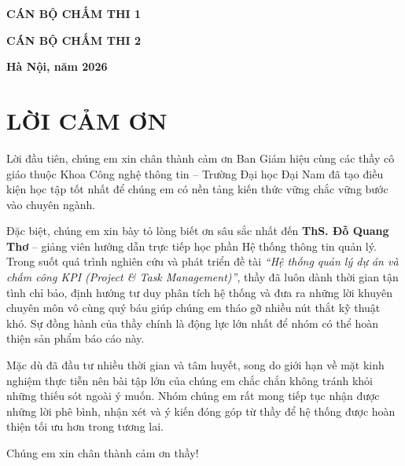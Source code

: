 \documentclass[a4paper,13.5pt]{extreport}
\begin{document}
\begin{titlepage}
\vspace{1.2cm}
\begin{center}
\begin{minipage}{0.45\textwidth}
\centering
\textbf{CÁN BỘ CHẤM THI 1}
\end{minipage}%
\begin{minipage}{0.45\textwidth}
\centering
\textbf{CÁN BỘ CHẤM THI 2}
\end{minipage}
\end{center}

\vfill
\begin{center}
    \textbf{Hà Nội, năm 2026}
\end{center}
\end{titlepage}

\chapter*{LỜI CẢM ƠN}

\vspace{0.5cm} 

Lời đầu tiên, chúng em xin chân thành cảm ơn Ban Giám hiệu cùng các thầy cô giáo thuộc Khoa Công nghệ thông tin – Trường Đại học Đại Nam đã tạo điều kiện học tập tốt nhất để chúng em có nền tảng kiến thức vững chắc vững bước vào chuyên ngành.

Đặc biệt, chúng em xin bày tỏ lòng biết ơn sâu sắc nhất đến \textbf{ThS. Đỗ Quang Thơ} – giảng viên hướng dẫn trực tiếp học phần Hệ thống thông tin quản lý. Trong suốt quá trình nghiên cứu và phát triển đề tài \textit{“Hệ thống quản lý dự án và chấm công KPI (Project \& Task Management)”}, thầy đã luôn dành thời gian tận tình chỉ bảo, định hướng tư duy phân tích hệ thống và đưa ra những lời khuyên chuyên môn vô cùng quý báu giúp chúng em tháo gỡ nhiều nút thắt kỹ thuật khó. Sự đồng hành của thầy chính là động lực lớn nhất để nhóm có thể hoàn thiện sản phẩm báo cáo này.

Mặc dù đã đầu tư nhiều thời gian và tâm huyết, song do giới hạn về mặt kinh nghiệm thực tiễn nên bài tập lớn của chúng em chắc chắn không tránh khỏi những thiếu sót ngoài ý muốn. Nhóm chúng em rất mong tiếp tục nhận được những lời phê bình, nhận xét và ý kiến đóng góp từ thầy để hệ thống được hoàn thiện tối ưu hơn trong tương lai.

Chúng em xin chân thành cảm ơn thầy!
\end{document}
